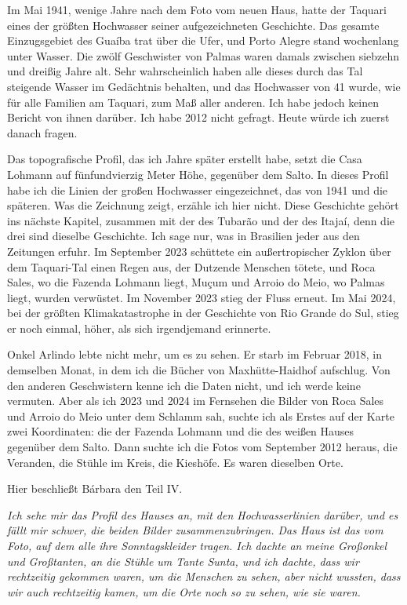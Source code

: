 \documentclass[
  ngerman,
  11pt,
  openany]{book}
\begin{document}
Im Mai 1941, wenige Jahre nach dem Foto vom neuen Haus, hatte der
Taquari eines der größten Hochwasser seiner aufgezeichneten Geschichte.
Das gesamte Einzugsgebiet des Guaíba trat über die Ufer, und Porto
Alegre stand wochenlang unter Wasser. Die zwölf Geschwister von Palmas
waren damals zwischen siebzehn und dreißig Jahre alt. Sehr
wahrscheinlich haben alle dieses durch das Tal steigende Wasser im
Gedächtnis behalten, und das Hochwasser von 41 wurde, wie für alle
Familien am Taquari, zum Maß aller anderen. Ich habe jedoch keinen
Bericht von ihnen darüber. Ich habe 2012 nicht gefragt. Heute würde ich
zuerst danach fragen.

Das topografische Profil, das ich Jahre später erstellt habe, setzt die
Casa Lohmann auf fünfundvierzig Meter Höhe, gegenüber dem Salto. In
dieses Profil habe ich die Linien der großen Hochwasser eingezeichnet,
das von 1941 und die späteren. Was die Zeichnung zeigt, erzähle ich hier
nicht. Diese Geschichte gehört ins nächste Kapitel, zusammen mit der des
Tubarão und der des Itajaí, denn die drei sind dieselbe Geschichte. Ich
sage nur, was in Brasilien jeder aus den Zeitungen erfuhr. Im September
2023 schüttete ein außertropischer Zyklon über dem Taquari-Tal einen
Regen aus, der Dutzende Menschen tötete, und Roca Sales, wo die Fazenda
Lohmann liegt, Muçum und Arroio do Meio, wo Palmas liegt, wurden
verwüstet. Im November 2023 stieg der Fluss erneut. Im Mai 2024, bei der
größten Klimakatastrophe in der Geschichte von Rio Grande do Sul, stieg
er noch einmal, höher, als sich irgendjemand erinnerte.

Onkel Arlindo lebte nicht mehr, um es zu sehen. Er starb im Februar
2018, in demselben Monat, in dem ich die Bücher von Maxhütte-Haidhof
aufschlug. Von den anderen Geschwistern kenne ich die Daten nicht, und
ich werde keine vermuten. Aber als ich 2023 und 2024 im Fernsehen die
Bilder von Roca Sales und Arroio do Meio unter dem Schlamm sah, suchte
ich als Erstes auf der Karte zwei Koordinaten: die der Fazenda Lohmann
und die des weißen Hauses gegenüber dem Salto. Dann suchte ich die Fotos
vom September 2012 heraus, die Veranden, die Stühle im Kreis, die
Kieshöfe. Es waren dieselben Orte.

Hier beschließt Bárbara den Teil IV.

\emph{Ich sehe mir das Profil des Hauses an, mit den Hochwasserlinien
darüber, und es fällt mir schwer, die beiden Bilder zusammenzubringen.
Das Haus ist das vom Foto, auf dem alle ihre Sonntagskleider tragen. Ich
dachte an meine Großonkel und Großtanten, an die Stühle um Tante Sunta,
und ich dachte, dass wir rechtzeitig gekommen waren, um die Menschen zu
sehen, aber nicht wussten, dass wir auch rechtzeitig kamen, um die Orte
noch so zu sehen, wie sie waren.}
\end{document}

